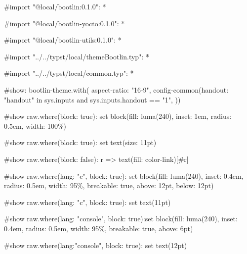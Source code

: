#import "@local/bootlin:0.1.0": *

#import "@local/bootlin-yocto:0.1.0": *

#import "@local/bootlin-utils:0.1.0": *

#import "../../typst/local/themeBootlin.typ": *

#import "../../typst/local/common.typ": *

#show: bootlin-theme.with( aspect-ratio: "16-9", config-common(handout: "handout" in sys.inputs and sys.inputs.handout == "1", ))

#show raw.where(block: true): set block(fill: luma(240), inset: 1em, radius: 0.5em, width: 100\%)

#show raw.where(block: true): set text(size: 11pt)

#show raw.where(block: false): r => text(fill: color-link)[#r]

#show raw.where(lang: "c", block: true): set block(fill: luma(240), inset: 0.4em, radius: 0.5em, width: 95\%, breakable: true, above: 12pt, below: 12pt)

#show raw.where(lang: "c", block: true): set text(11pt)

#show raw.where(lang: "console", block: true):set block(fill: luma(240), inset: 0.4em, radius: 0.5em, width: 95\%, breakable: true, above: 6pt)

#show raw.where(lang:"console", block: true): set text(12pt)


